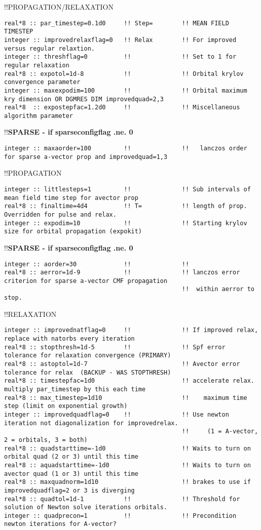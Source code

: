!!{\large \quad PROPAGATION/RELAXATION}
\begin{verbatim}
real*8 :: par_timestep=0.1d0     !! Step=        !! MEAN FIELD TIMESTEP
integer :: improvedrelaxflag=0   !! Relax        !! For improved versus regular relaxtion.   
integer :: threshflag=0          !!              !! Set to 1 for regular relaxation
real*8 :: expotol=1d-8           !!              !! Orbital krylov convergence parameter
integer :: maxexpodim=100        !!              !! Orbital maximum kry dimension OR DGMRES DIM improvedquad=2,3
real*8  :: expostepfac=1.2d0     !!              !! Miscellaneous algorithm parameter
\end{verbatim}
!!\textbf{\qquad SPARSE - if sparseconfigflag .ne. 0}
\begin{verbatim}
integer :: maxaorder=100         !!              !!   lanczos order for sparse a-vector prop and improvedquad=1,3
\end{verbatim}
!!{\large \quad PROPAGATION}
\begin{verbatim}
integer :: littlesteps=1         !!              !! Sub intervals of mean field time step for avector prop
real*8 :: finaltime=4d4          !! T=           !! length of prop.  Overridden for pulse and relax.  
integer :: expodim=10            !!              !! Starting krylov size for orbital propagation (expokit)
\end{verbatim}
!!\textbf{\qquad SPARSE - if sparseconfigflag .ne. 0}
\begin{verbatim}
integer :: aorder=30             !!              !!   
real*8 :: aerror=1d-9            !!              !! lanczos error criterion for sparse a-vector CMF propagation
                                                 !!  within aerror to stop.
\end{verbatim}
!!{\large \quad RELAXATION}
\begin{verbatim}
integer :: improvednatflag=0     !!              !! If improved relax, replace with natorbs every iteration
real*8 :: stopthresh=1d-5        !!              !! Spf error tolerance for relaxation convergence (PRIMARY)
real*8 :: astoptol=1d-7                          !! Avector error tolerance for relax  (BACKUP - WAS STOPTHRESH)
real*8 :: timestepfac=1d0                        !! accelerate relax. multiply par_timestep by this each time
real*8 :: max_timestep=1d10                      !!    maximum time step (limit on exponential growth)
integer :: improvedquadflag=0    !!              !! Use newton iteration not diagonalization for improvedrelax.
                                                 !!     (1 = A-vector, 2 = orbitals, 3 = both)
real*8 :: quadstarttime=-1d0                     !! Waits to turn on orbital quad (2 or 3) until this time
real*8 :: aquadstarttime=-1d0                    !! Waits to turn on avector quad (1 or 3) until this time
real*8 :: maxquadnorm=1d10                       !! brakes to use if improvedquadflag=2 or 3 is diverging
real*8 :: quadtol=1d-1           !!              !! Threshold for solution of Newton solve iterations orbitals.
integer :: quadprecon=1          !!              !! Precondition newton iterations for A-vector?
\end{verbatim}
